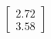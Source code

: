 \documentclass[preview]{standalone}
\begin{document}
\begin{align*}
\begin{bmatrix} 2.72 \\ 3.58 \end{bmatrix}
\end{align*}
\end{document}
